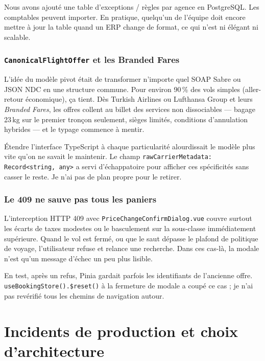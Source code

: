 Nous avons ajouté une table d'exceptions / règles par agence en PostgreSQL. Les comptables peuvent importer. En pratique, quelqu'un de l'équipe doit encore mettre à jour la table quand un ERP change de format, ce qui n'est ni élégant ni scalable.

\subsection{\texttt{CanonicalFlightOffer} et les Branded Fares}

L'idée du modèle pivot était de transformer n'importe quel SOAP Sabre ou JSON NDC en une structure commune. Pour environ 90\,\% des vols simples (aller-retour économique), ça tient. Dès Turkish Airlines ou Lufthansa Group et leurs \textit{Branded Fares}, les offres collent au billet des services non dissociables --- bagage 23\,kg sur le premier tronçon seulement, sièges limités, conditions d'annulation hybrides --- et le typage commence à mentir.

Étendre l'interface TypeScript à chaque particularité alourdissait le modèle plus vite qu'on ne savait le maintenir. Le champ \texttt{rawCarrierMetadata: Record<string, any>} a servi d'échappatoire pour afficher ces spécificités sans casser le reste. Je n'ai pas de plan propre pour le retirer.

\subsection{Le 409 ne sauve pas tous les paniers}

L'interception HTTP 409 avec \texttt{PriceChangeConfirmDialog.vue} couvre surtout les écarts de taxes modestes ou le basculement sur la sous-classe immédiatement supérieure. Quand le vol est fermé, ou que le saut dépasse le plafond de politique de voyage, l'utilisateur refuse et relance une recherche. Dans ces cas-là, la modale n'est qu'un message d'échec un peu plus lisible.

En test, après un refus, Pinia gardait parfois les identifiants de l'ancienne offre. \texttt{useBookingStore().\$reset()} à la fermeture de modale a coupé ce cas ; je n'ai pas revérifié tous les chemins de navigation autour.

\chapter{Incidents de production et choix d'architecture}
\label{chap:bilan_critique_technique}

